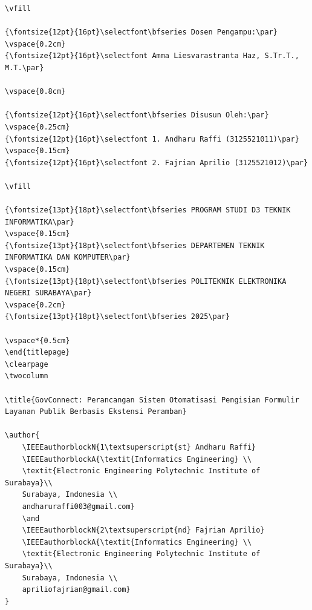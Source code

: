 \documentclass[conference]{IEEEtran}
\begin{document}
\begin{lstlisting}
\vfill

{\fontsize{12pt}{16pt}\selectfont\bfseries Dosen Pengampu:\par}
\vspace{0.2cm}
{\fontsize{12pt}{16pt}\selectfont Amma Liesvarastranta Haz, S.Tr.T., M.T.\par}

\vspace{0.8cm}

{\fontsize{12pt}{16pt}\selectfont\bfseries Disusun Oleh:\par}
\vspace{0.25cm}
{\fontsize{12pt}{16pt}\selectfont 1. Andharu Raffi (3125521011)\par}
\vspace{0.15cm}
{\fontsize{12pt}{16pt}\selectfont 2. Fajrian Aprilio (3125521012)\par}

\vfill

{\fontsize{13pt}{18pt}\selectfont\bfseries PROGRAM STUDI D3 TEKNIK INFORMATIKA\par}
\vspace{0.15cm}
{\fontsize{13pt}{18pt}\selectfont\bfseries DEPARTEMEN TEKNIK INFORMATIKA DAN KOMPUTER\par}
\vspace{0.15cm}
{\fontsize{13pt}{18pt}\selectfont\bfseries POLITEKNIK ELEKTRONIKA NEGERI SURABAYA\par}
\vspace{0.2cm}
{\fontsize{13pt}{18pt}\selectfont\bfseries 2025\par}

\vspace*{0.5cm}
\end{titlepage}
\clearpage
\twocolumn

\title{GovConnect: Perancangan Sistem Otomatisasi Pengisian Formulir Layanan Publik Berbasis Ekstensi Peramban}

\author{
    \IEEEauthorblockN{1\textsuperscript{st} Andharu Raffi}
    \IEEEauthorblockA{\textit{Informatics Engineering} \\
    \textit{Electronic Engineering Polytechnic Institute of Surabaya}\\
    Surabaya, Indonesia \\
    andharuraffi003@gmail.com}
    \and
    \IEEEauthorblockN{2\textsuperscript{nd} Fajrian Aprilio}
    \IEEEauthorblockA{\textit{Informatics Engineering} \\
    \textit{Electronic Engineering Polytechnic Institute of Surabaya}\\
    Surabaya, Indonesia \\
    apriliofajrian@gmail.com}
}


\end{lstlisting}
\end{document}
